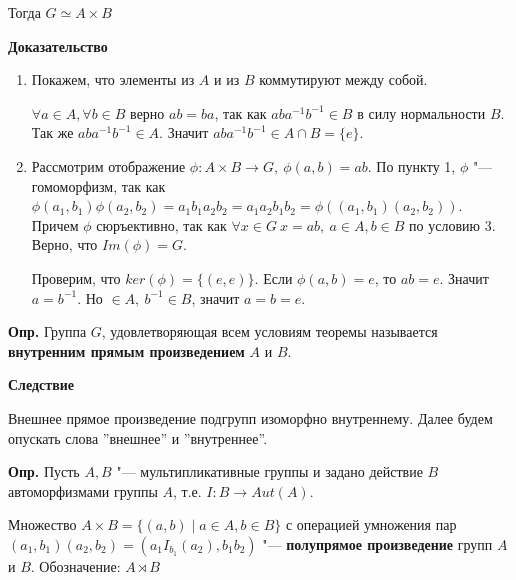 \documentclass{article}
\begin{document}
Тогда $G \simeq A \times B$

\textbf{Доказательство}
\begin{enumerate}
	\item Покажем, что элементы из $A$ и из $B$ коммутируют между собой.
	
	$\forall a \in A, \forall b \in B$ верно $ab = ba$, так как $aba^{-1}b^{-1} \in B$ в силу нормальности $B$. Так же $aba^{-1}b^{-1} \in A$. Значит $aba^{-1}b^{-1} \in A \cap B = \{e\}$.
	
	\item Рассмотрим отображение $\phi: A \times B \rightarrow G, \  \phi(a,b) = ab$. По пункту 1, $\phi$ "--- гомоморфизм, так как $\phi(a_1, b_1)\phi(a_2, b_2) = a_1b_1a_2b_2 = a_1a_2b_1b_2 = \phi((a_1, b_1)(a_2, b_2))$. Причем $\phi$ сюръективно, так как $\forall x \in G \  x = ab, \  a \in A, b \in B$ по условию 3. Верно, что $Im(\phi) = G$.

	Проверим, что $ker(\phi) = \{(e, e)\}$. Если $\phi(a, b) = e$, то $ab = e$. Значит $a = b^{-1}$. Но $ \in A, \   b^{-1} \in B$, значит $a = b = e$.
\end{enumerate}

\vspace{10pt}

\textbf{Опр.} Группа $G$, удовлетворяющая всем условиям теоремы называется \textbf{внутренним прямым произведением} $A$ и $B$.

\vspace{10pt}

\textbf{Следствие}

Внешнее прямое произведение подгрупп изоморфно внутреннему. Далее будем опускать слова ''внешнее'' и ''внутреннее''.

\textbf{Опр.} Пусть $A, B$ "--- мультипликативные группы и задано действие $B$ автоморфизмами группы $A$, т.е. $I: B \rightarrow Aut(A)$.

Множество $A \times B = \{(a, b) \mid a \in A, b \in B\}$ с операцией умножения пар $(a_1, b_1)(a_2, b_2) = (a_1I_{b_1}(a_2), b_1b_2)$ "--- \textbf{полупрямое произведение} групп $A$ и $B$. Обозначение: $A \rtimes B$ 
\end{document}
